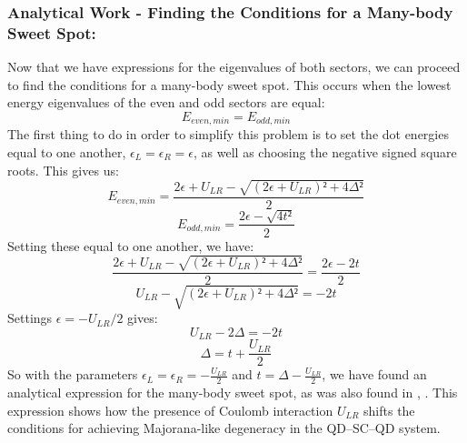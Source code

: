 \documentclass[11pt, letterpaper, titlepage]{article}
\begin{document}
\subsubsection{Analytical Work - Finding the Conditions for a Many-body Sweet Spot:}
Now that we have expressions for the eigenvalues of both sectors, we can proceed to find the conditions for a many-body sweet spot. This occurs when the lowest energy eigenvalues of the even and odd sectors are equal:
$$E_{even,min} = E_{odd,min}$$
The first thing to do in order to simplify this problem is to set the dot energies equal to one another, $ϵ_L = ϵ_R = ϵ$, as well as choosing the negative signed square roots. This gives us:
$$E_{even,min} = \frac{2ϵ + U_{LR} - \sqrt{(2ϵ + U_{LR})² + 4Δ²}}{2}$$
$$E_{odd,min} = \frac{2ϵ - \sqrt{4t²}}{2}$$
Setting these equal to one another, we have:
$$\frac{2ϵ + U_{LR} - \sqrt{(2ϵ + U_{LR})² + 4Δ²}}{2} = \frac{2ϵ - 2t}{2}$$
$$U_{LR} - \sqrt{(2ϵ + U_{LR})² + 4Δ²} = -2t$$
Settings $\epsilon= -U_{LR}/2$ gives:
$$U_{LR} - 2Δ = -2t$$
$$Δ = t + \frac{U_{LR}}{2}$$
So with the parameters $ϵ_L = ϵ_R = -\frac{U_{LR}}{2}$ and $t = Δ - \frac{U_{LR}}{2}$, we have found an analytical expression for the many-body sweet spot, as was also found in \cite{sweetspot}, \cite{VikWilMar}. This expression shows how the presence of Coulomb interaction $U_{LR}$ shifts the conditions for achieving Majorana-like degeneracy in the QD–SC–QD system.
\end{document}
